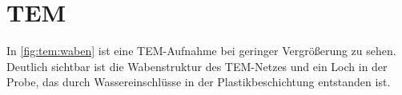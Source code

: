 \section{TEM}



In \cref{fig:tem:waben} ist eine TEM-Aufnahme bei geringer Vergrößerung zu sehen.
Deutlich sichtbar ist die Wabenstruktur des TEM-Netzes und ein Loch in der Probe, das durch Wassereinschlüsse in der Plastikbeschichtung entstanden ist. %

